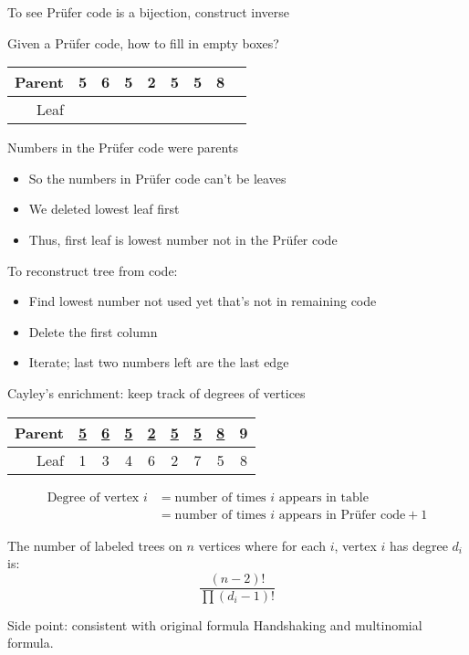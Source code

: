 \documentclass{beamer}
\begin{document}
\begin{frame}{To see Pr\"ufer code is a bijection, construct inverse}
  \begin{block}{Given a Pr\"ufer code, how to fill in empty boxes?}
        \begin{tabular}{r|c|c|c|c|c|c|c|c}
        Parent & 5 & 6 & 5 & 2 & 5 & 5 & 8 &  \\ \hline
        Leaf   &  &  &  &  &  &  &  &  
        \end{tabular}
    \end{block}

\begin{block}{Numbers in the Pr\"ufer code were parents}
  \begin{itemize}
  \item So the numbers in Pr\"ufer code can't be leaves
  \item We deleted lowest leaf first
  \item Thus, first leaf is lowest number not in the Pr\"ufer code
  \end{itemize}
  \end{block}
\begin{block}{To reconstruct tree from code:}
  \begin{itemize}
  \item Find lowest number not used yet that's not in remaining code
  \item Delete the first column
  \item Iterate; last two numbers left are the last edge
    \end{itemize}

\end{block}

\end{frame}

\begin{frame}{Cayley's enrichment: keep track of degrees of vertices}
        \begin{tabular}{r|c|c|c|c|c|c|c|c}

        Parent & \underline{5} & \underline{6} & \underline{5} & \underline{2} & \underline{5} & \underline{5} & \underline{8} & 9 \\ \hline
        Leaf   & 1 & 3 & 4 & 6 & 2 & 7 & 5 & 8 
        \end{tabular}
        \begin{align*}
          \text{Degree of vertex $i$} & = \text{number of times $i$ appears in table} \\
          & = \text{number of times $i$ appears in Pr\"ufer code}+1
        \end{align*}


\begin{corollary}The number of labeled trees on $n$ vertices where for each $i$, vertex $i$ has degree $d_i$ is:
  $$\frac{(n-2)!}{\prod (d_i-1)!}$$
  \end{corollary}
\begin{block}{Side point: consistent with original formula}
Handshaking and multinomial formula.
\end{block}
\end{frame}
\end{document}
